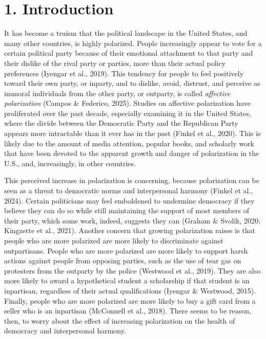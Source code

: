 \documentclass[authordate, meta, issue]{jote-new-article}
\author[1]{\mbox{Lukas K. Sotola\orcid{0000-0001-8120-394X}}}
\affil[1]{Department of Psychology, Pace University, Pleasantville, United States}
\begin{document}
\begin{frontmatter}
  \maketitle
  \begin{abstract}
    \printabstracttext
  \end{abstract}
\end{frontmatter}


	\section{1. Introduction}



	It has become a truism that the political landscape in the United States, and many other countries, is highly polarized. People increasingly appear to vote for a certain political party because of their emotional attachment to that party and their dislike of the rival party or parties, more than their actual policy preferences (Iyengar et al., 2019). This tendency for people to feel positively toward their own party, or inparty, and to dislike, avoid, distrust, and perceive as immoral individuals from the other party, or outparty, is called \emph{affective polarization }(Campos \& Federico, 2025). Studies on affective polarization have proliferated over the past decade, especially examining it in the United States, where the divide between the Democratic Party and the Republican Party appears more intractable than it ever has in the past (Finkel et al., 2020). This is likely due to the amount of media attention, popular books, and scholarly work that have been devoted to the apparent growth and danger of polarization in the U.S., and, increasingly, in other countries.



	This perceived increase in polarization is concerning, because polarization can be seen as a threat to democratic norms and interpersonal harmony (Finkel et al., 2024). Certain politicians may feel emboldened to undermine democracy if they believe they can do so while still maintaining the support of most members of their party, which some work, indeed, suggests they can (Graham \& Svolik, 2020; Kingzette et al., 2021). Another concern that growing polarization raises is that people who are more polarized are more likely to discriminate against outpartisans. People who are more polarized are more likely to support harsh actions against people from opposing parties, such as the use of tear gas on protesters from the outparty by the police (Westwood et al., 2019). They are also more likely to award a hypothetical student a scholarship if that student is an inpartisan, regardless of their actual qualifications (Iyengar \& Westwood, 2015). Finally, people who are more polarized are more likely to buy a gift card from a seller who is an inpartisan (McConnell et al., 2018). There seems to be reason, then, to worry about the effect of increasing polarization on the health of democracy and interpersonal harmony.
\end{document}
